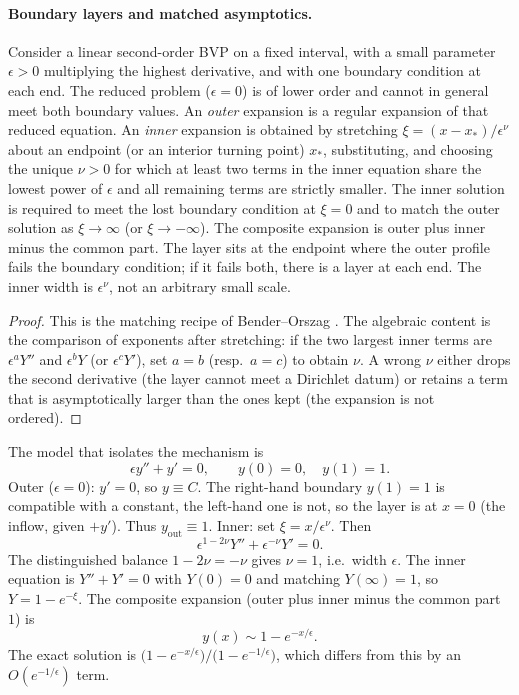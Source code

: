 \documentclass[11pt,a4paper]{article}
\begin{document}
\paragraph{Boundary layers and matched asymptotics.}

\begin{theorem}
\label{thm:distinguished-balance}
Consider a linear second-order BVP on a fixed interval, with a small parameter \(\epsilon>0\) multiplying the highest derivative, and with one boundary condition at each end. The reduced problem (\(\epsilon=0\)) is of lower order and cannot in general meet both boundary values. An \emph{outer} expansion is a regular expansion of that reduced equation. An \emph{inner} expansion is obtained by stretching \(\xi=(x-x_{*})/\epsilon^{\nu}\) about an endpoint (or an interior turning point) \(x_{*}\), substituting, and choosing the unique \(\nu>0\) for which at least two terms in the inner equation share the lowest power of \(\epsilon\) and all remaining terms are strictly smaller. The inner solution is required to meet the lost boundary condition at \(\xi=0\) and to match the outer solution as \(\xi\to\infty\) (or \(\xi\to-\infty\)). The composite expansion is outer plus inner minus the common part. The layer sits at the endpoint where the outer profile fails the boundary condition; if it fails both, there is a layer at each end. The inner width is \(\epsilon^{\nu}\), not an arbitrary small scale.
\end{theorem}

\begin{proof}
This is the matching recipe of Bender--Orszag \cite[Ch.~9]{bender99}. The algebraic content is the comparison of exponents after stretching: if the two largest inner terms are \(\epsilon^{a}Y''\) and \(\epsilon^{b}Y\) (or \(\epsilon^{c}Y'\)), set \(a=b\) (resp.\ \(a=c\)) to obtain \(\nu\). A wrong \(\nu\) either drops the second derivative (the layer cannot meet a Dirichlet datum) or retains a term that is asymptotically larger than the ones kept (the expansion is not ordered).
\end{proof}

\begin{example}
\label{ex:bl-model}
The model that isolates the mechanism is
\[
\epsilon y''+y'=0,
\qquad
y(0)=0,\quad y(1)=1.
\]
Outer (\(\epsilon=0\)): \(y'=0\), so \(y\equiv C\). The right-hand boundary \(y(1)=1\) is compatible with a constant, the left-hand one is not, so the layer is at \(x=0\) (the inflow, given \(+y'\)). Thus \(y_{\mathrm{out}}\equiv 1\). Inner: set \(\xi=x/\epsilon^{\nu}\). Then
\[
\epsilon^{1-2\nu}Y''+\epsilon^{-\nu}Y'=0.
\]
The distinguished balance \(1-2\nu=-\nu\) gives \(\nu=1\), i.e.\ width \(\epsilon\). The inner equation is \(Y''+Y'=0\) with \(Y(0)=0\) and matching \(Y(\infty)=1\), so \(Y=1-e^{-\xi}\). The composite expansion (outer plus inner minus the common part \(1\)) is
\[
y(x)
\sim
1-e^{-x/\epsilon}.
\]
The exact solution is \(\bigl(1-e^{-x/\epsilon}\bigr)/\bigl(1-e^{-1/\epsilon}\bigr)\), which differs from this by an \(O(e^{-1/\epsilon})\) term.
\end{example}
\end{document}
